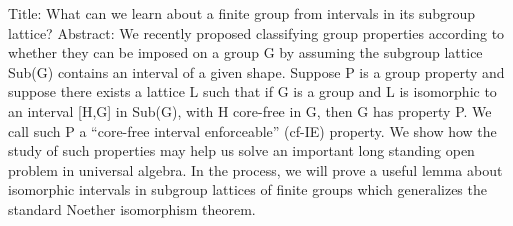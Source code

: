 Title: What can we learn about a finite group from intervals in its subgroup lattice?
Abstract: We recently proposed classifying group properties according to whether
they can be imposed on a group G by assuming the subgroup lattice Sub(G)
contains an interval of a given shape.  Suppose P is a group property and suppose
there exists a lattice L such that if G is a group and L is isomorphic to an
interval [H,G] in Sub(G), with H core-free in G, then G has property P.  
We call such P a ``core-free interval enforceable'' (cf-IE) property. We show
how the study of such properties may help us solve an important long standing
open problem in universal algebra.   In the process, we will prove a useful
lemma about isomorphic intervals in subgroup lattices of finite groups which
generalizes the standard Noether isomorphism theorem. 


